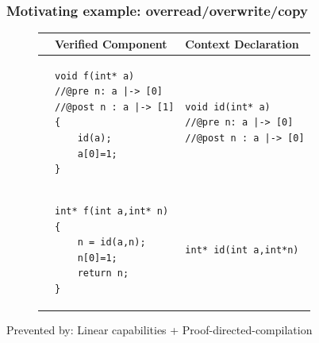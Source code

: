 \documentclass{beamer}
\begin{document}
\begin{frame}[fragile]
\frametitle{Motivating example: overread/overwrite/copy}
\begin{figure}[ht]
\begin{tabular}{c|M{.4\textwidth}|M{.4\textwidth}}
& \textbf{Verified Component}  & \textbf{Context Declaration} \\
\hline%
&
{\begin{lstlisting}[style=CStyle,numbers=none,belowskip=-1em]
void f(int* a)
//@pre n: a |-> [0]  
//@post n : a |-> [1]
{
	id(a); 
	a[0]=1;
}
\end{lstlisting}}
&
{\begin{lstlisting}[style=CStyle,numbers=none,belowskip=-1em]
void id(int* a)
//@pre n: a |-> [0]  
//@post n : a |-> [0]
\end{lstlisting}}\\


\hline


&
{\begin{lstlisting}[style=CStyle,numbers=none,belowskip=-1em]
int* f(int a,int* n)
{
	n = id(a,n); 
	n[0]=1;
	return n;
}
\end{lstlisting}}&
{\begin{lstlisting}[style=CStyle,numbers=none,belowskip=-1em]
int* id(int a,int*n)
\end{lstlisting}}\\
\end{tabular} 
\label{trivialexample}
\end{figure} %

Prevented by: Linear capabilities + Proof-directed-compilation
\end{frame}

\end{document}
